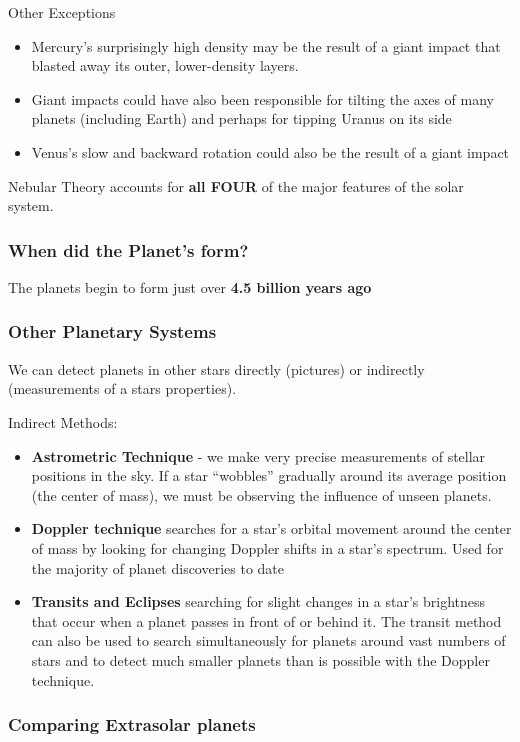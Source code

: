 \documentclass[12pt]{article}
\begin{document}
Other Exceptions
\begin{itemize}
\item Mercury’s surprisingly high density may be the result of a giant impact that blasted away its outer, lower-density layers.
\item Giant impacts could have also been responsible for tilting the axes of many planets (including Earth) and perhaps for tipping Uranus on its side
\item Venus’s slow and backward rotation could also be the result of a giant impact
\end{itemize}
Nebular Theory accounts for {\bf all FOUR} of the major features of the solar system.

\subsubsection{When did the Planet's form?}
The planets begin to form just over {\bf 4.5 billion years ago}

\subsubsection{Other Planetary Systems}
We can detect planets in other stars directly (pictures) or indirectly (measurements of a stars properties).

Indirect Methods:
\begin{itemize}
\item {\bf Astrometric Technique} - we make very precise measurements of stellar positions in the sky. If a star “wobbles” gradually around its average position (the center of mass), we must be observing the influence of unseen planets.
\item {\bf Doppler technique} searches for a star’s orbital movement around the center of mass by looking for changing Doppler shifts in a star’s spectrum. Used for the majority of planet discoveries to date
\item {\bf Transits and Eclipses} searching for slight changes in a star’s brightness that
occur when a planet passes in front of or behind it. The transit method can also be used to search simultaneously for planets around vast numbers of stars and to detect much smaller planets than is possible with the Doppler technique.
\end{itemize}

\subsubsection{Comparing Extrasolar planets}
\end{document}
